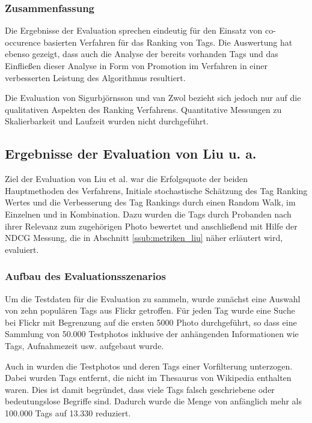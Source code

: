 
\subsubsection*{Zusammenfassung} %
\label{ssub:zusammenfassung}
Die Ergebnisse der Evaluation sprechen eindeutig für den Einsatz von co-occurence basierten Verfahren für das Ranking von Tags. Die Auswertung hat ebenso gezeigt, dass auch die Analyse der bereits vorhanden Tags und das Einfließen dieser Analyse in Form von Promotion im Verfahren in einer verbesserten Leistung des Algorithmus resultiert.

Die Evaluation von Sigurbjörnsson und van Zwol bezieht sich jedoch nur auf die qualitativen Aspekten des Ranking Verfahrens. Quantitative Messungen zu Skalierbarkeit und Laufzeit wurden nicht durchgeführt. 


\subsection{Ergebnisse der Evaluation von Liu u. a.} %
\label{sub:ergebnisse_der_evaluation_von_liu}

Ziel der Evaluation von Liu et al. war die Erfolgsquote der beiden Hauptmethoden des Verfahrens, Initiale stochastische Schätzung des Tag Ranking Wertes und die Verbesserung des Tag Rankings durch einen Random Walk, im Einzelnen und in Kombination. Dazu wurden die Tags durch Probanden nach ihrer Relevanz zum zugehörigen Photo bewertet und anschließend mit Hilfe der NDCG Messung, die in Abschnitt \ref{ssub:metriken_liu} näher erläutert wird, evaluiert.

\subsubsection{Aufbau des Evaluationsszenarios} %
\label{ssub:aufbau_des_evaluationsszenarios_liu}
Um die Testdaten für die Evaluation zu sammeln, wurde zunächst eine Auswahl von zehn populären Tags aus Flickr getroffen. Für jeden Tag wurde eine Suche bei Flickr mit Begrenzung auf die ersten 5000 Photo durchgeführt, so dass eine Sammlung von 50.000 Testphotos inklusive der anhängenden Informationen wie Tags, Aufnahmezeit usw. aufgebaut wurde.

Auch in \cite{ranking} wurden die Testphotos und deren Tags einer Vorfilterung unterzogen. Dabei wurden Tags entfernt, die nicht im Thesaurus von Wikipedia enthalten waren. Dies ist damit begründet, dass viele Tags falsch geschriebene oder bedeutungslose Begriffe sind. Dadurch wurde die Menge von anfänglich mehr als 100.000 Tags auf 13.330 reduziert.

